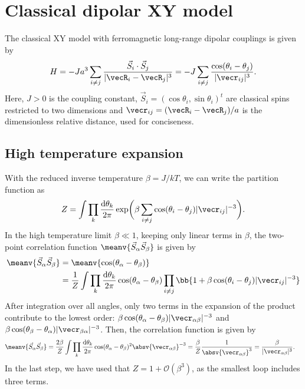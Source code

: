 \chapter{Classical dipolar XY model}
\label{xy_model}

The classical XY model with ferromagnetic long-range dipolar couplings is given by
\begin{align}
    H = -J a^3 \sum_{i\ne j} \frac{\vec{S}_i \cdot \vec{S}_j}{|\vecR_i - \vecR_j|^3}
  = -J \sum_{i\ne j} \frac{\cos(\theta_i - \theta_j)}{|\vecr_{ij}|^3}.
\end{align}
Here, $J>0$ is the coupling constant, $\vec{S}_i=(\cos \theta_i, \sin \theta_i)^t$ are classical spins restricted to two dimensions and $\vecr_{ij}=(\vecR_i - \vecR_j)/a$ is the dimensionless relative distance, used for conciseness.

\section{High temperature expansion}
With the reduced inverse temperature $\beta = J/kT$, we can write the partition function as
\begin{align}
    Z=\int\prod_{k} \frac{\mathrm{d}\theta_k}{2\pi}  \operatorname{exp}\!\bigg(\beta \sum_{i\ne j} \cos(\theta_i - \theta_j) |\vecr_{ij}|^{-3} \bigg).
\end{align}
In the high temperature limit $\beta \ll 1$, keeping only linear terms in $\beta$,
the two-point correlation function $\meanv{\vec{S}_\alpha \vec{S}_\beta}$ is given by
\begin{align}
    \meanv{\vec{S}_\alpha \vec{S}_\beta} &= \meanv{\cos(\theta_\alpha - \theta_\beta)} \\ &= \frac{1}{Z} \int\prod_{k} \frac{\mathrm{d}\theta_k}{2\pi}  \cos(\theta_\alpha - \theta_\beta)
    \prod_{i\ne j}  \bb{1 + \beta \cos(\theta_i - \theta_j) |\vecr_{ij}|^{-3}}
\end{align}
After integration over all angles, only two terms in the expansion of the product contribute to the lowest order: $\beta \cos(\theta_\alpha - \theta_\beta) |\vecr_{\alpha\beta}|^{-3}$ and $\beta \cos(\theta_\beta - \theta_\alpha) |\vecr_{\beta\alpha}|^{-3}$. Then, the correlation function is given by
\begin{align}
    \meanv{\vec{S}_\alpha \vec{S}_\beta} &= \frac{2 \beta}{Z} \int\prod_{k} \frac{\mathrm{d}\theta_k}{2\pi} \cos(\theta_\alpha - \theta_\beta)^2 \absv{\vecr_{\alpha\beta}}^{-3}
    = \frac{\beta}{Z} \frac{1}{\absv{\vecr_{\alpha\beta}}^3} = \frac{\beta}{|\vecr_{\alpha\beta}|^3}.
\end{align}
In the last step, we have used that $Z = 1+ \mathcal{O}(\beta^3)$, as the smallest loop includes three terms.
